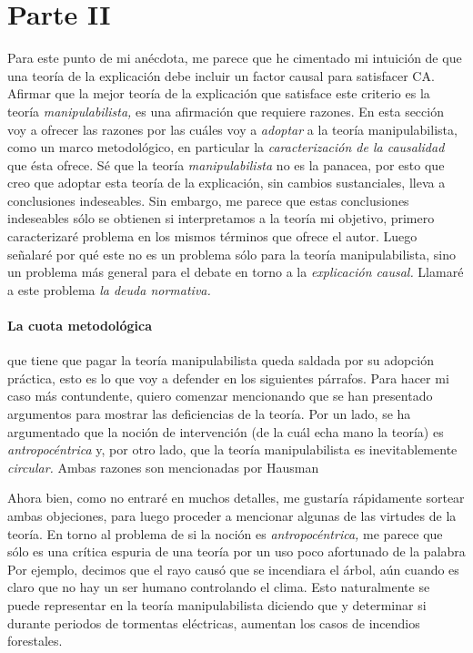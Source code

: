 {{\section{Parte II}
\label{s:pii}

\noindent Para este punto de mi anécdota, me parece que he
cimentado mi intuición de que una teoría de la explicación
debe incluir un factor causal para satisfacer CA. Afirmar que la mejor teoría de la explicación que satisface este criterio es la teoría \emph{manipulabilista,} es una afirmación que requiere razones. En esta sección voy a ofrecer las razones por las cuáles voy a
\emph{adoptar} a la teoría manipulabilista, como un marco
metodológico, en particular la
\emph{caracterización de la causalidad} que ésta ofrece. Sé
que la teoría \emph{manipulabilista} no es la panacea, por
esto que creo que adoptar esta teoría de la explicación, sin
cambios sustanciales, lleva a conclusiones indeseables. Sin embargo, me parece que estas conclusiones
indeseables sólo se obtienen si interpretamos a la teoría
mi objetivo, primero caracterizaré  problema en los mismos términos que
ofrece el autor. Luego señalaré por qué este no es un
problema sólo para la teoría manipulabilista, sino un
problema más general para el debate en torno a la
\emph{explicación causal.}
Llamaré a este problema \emph{la deuda normativa.}

\paragraph{La cuota metodológica} que tiene que pagar la
teoría manipulabilista queda saldada por su adopción
práctica, esto es lo que voy a defender en los siguientes
párrafos. Para hacer mi caso más contundente, quiero
comenzar mencionando que se han presentado argumentos
para mostrar las deficiencias de la teoría. Por un lado, se
ha argumentado que la noción de intervención (de la cuál
echa mano la teoría) es \emph{antropocéntrica} y, por otro
lado, que la teoría manipulabilista es inevitablemente
\emph{circular.} Ambas razones son mencionadas por Hausman

Ahora bien, como no entraré en muchos detalles, me gustaría
rápidamente sortear ambas objeciones, para luego proceder a
mencionar algunas de las virtudes de la teoría. En torno al
problema de si la noción es \emph{antropocéntrica,} me
parece que sólo es una crítica espuria de una teoría por un
uso poco afortunado de la palabra  Por
ejemplo, decimos que el rayo causó que se incendiara el
árbol, aún cuando es claro que no hay un ser humano
controlando el clima. Esto naturalmente se puede representar
en la teoría manipulabilista diciendo que  y determinar si durante
periodos de tormentas eléctricas, aumentan los casos de
incendios forestales.

}}
